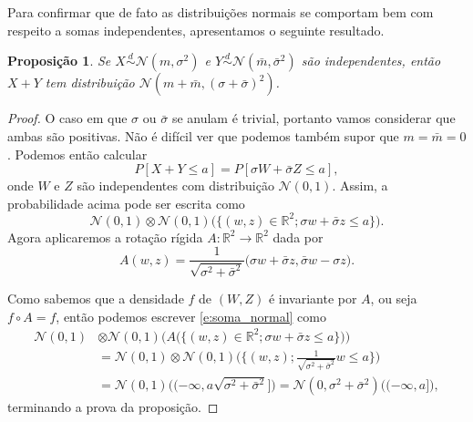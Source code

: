 \documentclass[reqno, draft]{book}
\newcommand*\1{\mathds{1}}
\newtheorem{proposition}[theorem]{Proposição}
\def \distr{\overset{d}{\sim}}
\begin{document}
Para confirmar que de fato as distribuições normais se comportam bem com respeito a somas independentes, apresentamos o seguinte resultado.

\begin{proposition}
  \label{p:soma_normais}
  Se $X \distr \mathcal{N}(m, \sigma^2)$ e $Y \distr \mathcal{N}(\bar{m}, \bar{\sigma}^2)$ são independentes, então $X + Y$ tem distribuição $\mathcal{N}(m + \bar{m}, (\sigma + \bar{\sigma})^2)$.
\end{proposition}

\begin{proof}
  O caso em que $\sigma$ ou $\bar{\sigma}$ se anulam é trivial, portanto vamos considerar que ambas são positivas.
  Não é difícil ver que podemos também supor que $m = \bar{m} = 0$.
  Podemos então calcular
  \begin{equation}
    P[X + Y \leq a] = P[\sigma W + \bar{\sigma} Z \leq a],
  \end{equation}
  onde $W$ e $Z$ são independentes com distribuição $\mathcal{N}(0,1)$.
  Assim, a probabilidade acima pode ser escrita como
  \begin{equation}
    \label{e:soma_normal}
    \mathcal{N}(0,1) \otimes \mathcal{N}(0,1) \Big( \big\{ (w,z) \in \mathbb{R}^2; \sigma w + \bar{\sigma} z \leq a \big\} \Big).
  \end{equation}
  Agora aplicaremos a rotação rígida $A: \mathbb{R}^2 \to \mathbb{R}^2$ dada por
  \begin{equation}
    A(w,z) = \frac{1}{\sqrt{\sigma^2 + \bar{\sigma}^2}} \big( \sigma w + \bar{\sigma} z, \bar{\sigma} w - \sigma z \big).
  \end{equation}

  Como sabemos que a densidade $f$ de $(W,Z)$ é invariante por $A$, ou seja $f \circ A = f$, então podemos escrever \eqref{e:soma_normal} como
  \begin{equation*}
    \begin{split}
      \mathcal{N}(0,1) & \otimes \mathcal{N}(0,1) \Big( A \big(\big\{ (w,z) \in \mathbb{R}^2; \sigma w + \bar{\sigma} z \leq a \big\} \big) \Big)\\
      & = \mathcal{N}(0,1) \otimes \mathcal{N}(0,1) \Big( \Big\{(w,z); \frac{1}{\sqrt{\sigma^2 + \bar{\sigma}^2}}w \leq a \Big\} \Big)\\
      & = \mathcal{N}(0,1) \big( (-\infty, a \sqrt{\sigma^2 + \bar{\sigma}^2} \big] \big) = \mathcal{N}(0,\sigma^2 + \bar{\sigma}^2) \big( (-\infty, a \big] \big),
    \end{split}
  \end{equation*}
  terminando a prova da proposição.
\end{proof}
\end{document}
